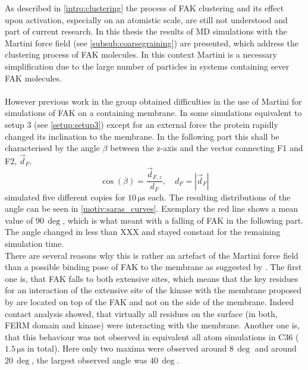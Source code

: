 \label{motivation}
As described in \autoref{intro:clustering} the process of FAK clustering and its effect upon activation, especially on an atomistic scale, are still not understood and part of current research. In this thesis the results of MD simulations with the Martini force field (see \autoref{subsub:coarsegraining}) are presented, which address the clustering process of FAK molecules. In this context Martini is a necessary simplification due to the large number of particles in systems containing sever FAK molecules.\\
\\
However previous work in the group \autocite{sara} obtained difficulties in the use of Martini for simulations of FAK on a \pip{} containing membrane. In some simulations equivalent to setup 3 (see \autoref{setup:setup3}) except for an external force the protein rapidly changed its inclination to the membrane. In the following part this shall be characterised by the angle $\beta$ between the z-axis and the vector connecting F1 and F2, $\vec{d}_F$.
\begin{equation}
\cos\left(\beta\right) = \frac{\vec{d}_{F, z}}{d_F},\quad d_F = \left|\vec{d}_F\right|
\end{equation}
\textcite{sara} simulated five different copies for $10\,\si{\micro\second}$ each. The resulting distributions of the angle can be seen in \autoref{motiv:saras_curves}. Exemplary the red line shows a mean value of $90\,\si{\deg}$, which is what meant with a falling of FAK in the following part. The angle changed in less than XXX and stayed constant for the remaining simulation time.\\
There are several reasons why this is rather an artefact of the Martini force field than a possible binding pose of FAK to the membrane as suggested by \textcite{pap002}. The first one is, that FAK falls to both extensive sites, which means that the key residues for an interaction of the extensive site of the kinase with the membrane proposed by \textcite{pap002} are located on top of the FAK and not on the side of the membrane. Indeed contact analysis showed, that virtually all residues on the surface (in both, FERM domain and kinase) were interacting with the membrane. Another one is, that this behaviour was not observed in equivalent all atom simulations in C36 ($1.5\,\si{\micro\second}$ in total). Here only two maxima were observed around $8\,\si{\deg}$ and around $20\,\si{\deg}$, the largest observed angle was $40\,\si{\deg}$.\\
\\
